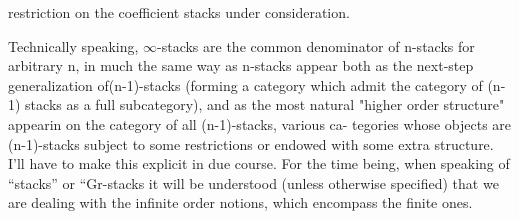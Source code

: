 restriction on the coefficient stacks under consideration.

 Technically speaking, $\infty$-stacks are the
common denominator of n-stacks for arbitrary n, in much the same way as
n-stacks appear both as the next-step generalization of(n-1)-stacks
(forming a category which admit the category of (n-1) stacks as a full
subcategory), and as the most natural "higher order structure" appearin
on the category of all  (n-1)-stacks,   various  ca-
tegories whose objects are (n-1)-stacks subject to some restrictions or
endowed with some extra structure\hand{)}. I'll have to make this explicit in
due course. For the time being, when speaking of ``stacks'' or ``Gr-stacks
it will be understood (unless otherwise specified) that we are dealing
with the infinite order notions, which encompass the finite ones.

